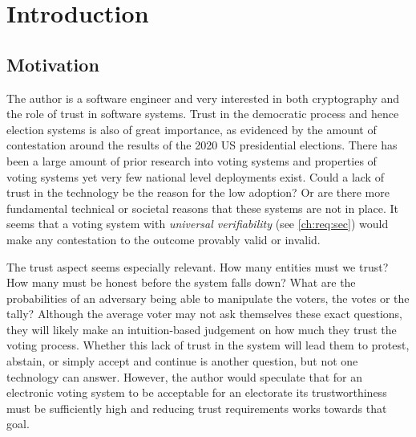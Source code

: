 \chapter{Introduction}
\label{ch:intro}

\section{Motivation}
\label{ch:intro:motiv}

The author is a software engineer and very interested in both cryptography and the role of trust in software systems. Trust in the democratic process and hence election systems is also of great importance, as evidenced by the amount of contestation around the results of the 2020 US presidential elections. There has been a large amount of prior research into voting systems \cite{
    panjaSecureEndtoendVerifiable2018,
    mccorrySmartContractBoardroom2017,
    liuEvotingProtocolBased2017,
    yangBlockchainVotingPublicly2020,
    spadaforaCoercionResistantBlockchainBasedEVoting2020,
    dimtiriouEfficientCoercionfreeUniversally2019,
    tsoukalasHeliosZeus2013,
    xiaVersatilePretVoter2010,
    ryanPrEtVoterVoterVerifiable2010,
    yuPlatformindependentSecureBlockchainBased2018,
    seifelnasrScalableOpenVoteNetwork2020,
    gajekTrustlessCensorshipResilientScalable2019,
    chillottiHomomorphicLWEBased} and properties of voting systems yet very few national level deployments exist. Could a lack of trust in the technology be the reason for the low adoption? Or are there more fundamental technical or societal reasons that these systems are not in place. It seems that a voting system with \emph{universal verifiability} (see \autoref{ch:req:sec}) would make any contestation to the outcome provably valid or invalid.

The trust aspect seems especially relevant. How many entities must we trust? How many must be honest before the system falls down? What are the probabilities of an adversary being able to manipulate the voters, the votes or the tally? Although the average voter may not ask themselves these exact questions, they will likely make an intuition-based judgement on how much they trust the voting process. Whether this lack of trust in the system will lead them to protest, abstain, or simply accept and continue is another question, but not one technology can answer. However, the author would speculate that for an electronic voting system to be acceptable for an electorate its trustworthiness must be sufficiently high and reducing trust requirements works towards that goal.

